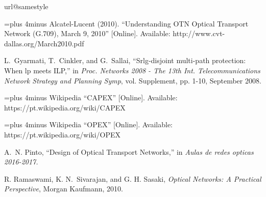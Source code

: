 {}
%
\renewcommand{\bibname}{Reference}
%
%
%
%
%
%

\begin{thebibliography}{10}
\providecommand{\url}[1]{#1}
\csname url@samestyle\endcsname
\providecommand{\newblock}{\relax}
\providecommand{\bibinfo}[2]{#2}
\providecommand{\BIBentrySTDinterwordspacing}{\spaceskip=0pt\relax}
\providecommand{\BIBentryALTinterwordstretchfactor}{4}
\providecommand{\BIBentryALTinterwordspacing}{\spaceskip=\fontdimen2\font plus
\BIBentryALTinterwordstretchfactor\fontdimen3\font minus
  \fontdimen4\font\relax}
\providecommand{\BIBforeignlanguage}[2]{{%
\expandafter\ifx\csname l@#1\endcsname\relax
\typeout{** WARNING: IEEEtran.bst: No hyphenation pattern has been}%
\typeout{** loaded for the language `#1'. Using the pattern for}%
\typeout{** the default language instead.}%
\else
\language=\csname l@#1\endcsname
\fi
#2}}
\providecommand{\BIBdecl}{\relax}
\BIBdecl

\BIBentryALTinterwordspacing
Alcatel-Lucent (2010). ``Understanding OTN Optical Transport Network (G.709), March 9, 2010'' [Online]. Available:
  \url{http://www.cvt-dallas.org/March2010.pdf}
\BIBentrySTDinterwordspacing

L.~Gyarmati, T.~Cinkler, and G.~Sallai, ``Srlg-disjoint multi-path protection: When lp meets ILP,'' in \emph{Proc. Networks 2008 - The 13th Int. Telecommunications Network Strategy and Planning Symp}, vol. Supplement, pp. 1-10, September 2008.

\BIBentryALTinterwordspacing
Wikipedia ``CAPEX'' [Online]. Available:
  \url{https://pt.wikipedia.org/wiki/CAPEX}
\BIBentrySTDinterwordspacing

\BIBentryALTinterwordspacing
Wikipedia ``OPEX'' [Online]. Available:
  \url{https://pt.wikipedia.org/wiki/OPEX}
\BIBentrySTDinterwordspacing

A.~N. Pinto, ``Design of Optical Transport Networks,'' in \emph{Aulas de redes opticas 2016-2017.}

R. Ramaswami, K. N.~Sivarajan, and G. H. Sasaki, \emph{Optical Networks: A Practical Perspective}, Morgan Kaufmann, 2010.


\end{thebibliography}
